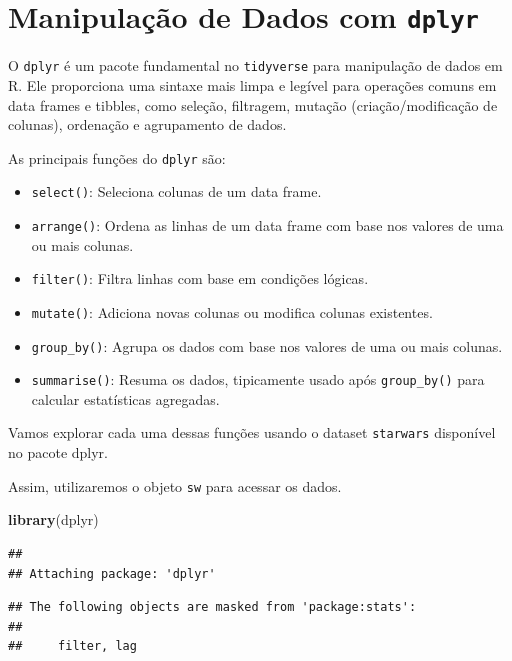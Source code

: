 \documentclass[
]{book}
\newenvironment{Shaded}{\begin{snugshade}}{\end{snugshade}}
\newcommand{\FunctionTok}[1]{\textcolor[rgb]{0.13,0.29,0.53}{\textbf{#1}}}
\newcommand{\NormalTok}[1]{#1}
\providecommand{\tightlist}{%
  \setlength{\itemsep}{0pt}\setlength{\parskip}{0pt}}
\begin{document}
\section{\texorpdfstring{Manipulação de Dados com \texttt{dplyr}}{Manipulação de Dados com dplyr}}\label{manipulauxe7uxe3o-de-dados-com-dplyr}

O \texttt{dplyr} é um pacote fundamental no \texttt{tidyverse} para manipulação de
dados em R. Ele proporciona uma sintaxe mais limpa e legível para
operações comuns em data frames e tibbles, como seleção, filtragem,
mutação (criação/modificação de colunas), ordenação e agrupamento de
dados.

As principais funções do \texttt{dplyr} são:

\begin{itemize}
\tightlist
\item
  \texttt{select()}: Seleciona colunas de um data frame.
\item
  \texttt{arrange()}: Ordena as linhas de um data frame com base nos valores de uma ou
  mais colunas.
\item
  \texttt{filter()}: Filtra linhas com base em condições lógicas.
\item
  \texttt{mutate()}: Adiciona novas colunas ou modifica colunas existentes.
\item
  \texttt{group\_by()}: Agrupa os dados com base nos valores de uma ou mais
  colunas.
\item
  \texttt{summarise()}: Resuma os dados, tipicamente usado após \texttt{group\_by()}
  para calcular estatísticas agregadas.
\end{itemize}

Vamos explorar cada uma dessas funções usando o dataset \texttt{starwars}
disponível no pacote dplyr.

Assim, utilizaremos o objeto \texttt{sw} para acessar os dados.

\begin{Shaded}
\begin{Highlighting}[]
\FunctionTok{library}\NormalTok{(dplyr)}
\end{Highlighting}
\end{Shaded}

\begin{verbatim}
## 
## Attaching package: 'dplyr'
\end{verbatim}

\begin{verbatim}
## The following objects are masked from 'package:stats':
## 
##     filter, lag
\end{verbatim}
\end{document}
